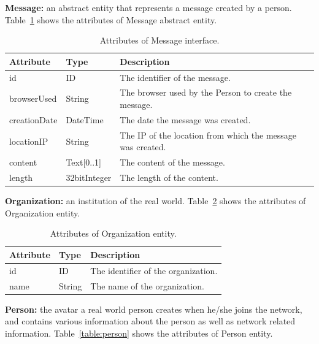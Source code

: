 {\flushleft \textbf{Message:}} an abstract entity that represents a message
created by a person. Table~\ref{table:message} shows the attributes of Message
abstract entity.

\begin{table}[H]
    \begin{tabular}{|p{2.5cm}|p{2.5cm}|p{10.5cm}|}
        \hline
        \textbf{Attribute} & \textbf{Type} & \textbf{Description} \\
        \hline
        id & ID  & The identifier of the message.\\
        \hline
        browserUsed & String  & The browser used by the Person to create the message.\\
        \hline
        creationDate & DateTime  & The date the message was created.\\
        \hline
        locationIP & String  & The IP of the location from which the message was created.\\
        \hline
        content & Text[0..1]  & The content of the message.\\
        \hline
        length & 32bitInteger  & The length of the content.\\
        \hline
    \end{tabular}
    \caption{Attributes of Message interface.}
    \label{table:message}
\end{table}

{\flushleft \textbf{Organization:}} an institution of the real
world. Table~\ref{table:organization} shows the attributes of Organization
entity.

\begin{table}[H]
    \begin{tabular}{|p{2.5cm}|p{2.5cm}|p{10.5cm}|}
        \hline
        \textbf{Attribute} & \textbf{Type} & \textbf{Description} \\
        \hline
        id & ID  & The identifier of the organization.\\
        \hline
        name & String  & The name of the organization.\\
        \hline
    \end{tabular}
    \caption{Attributes of Organization entity.}
    \label{table:organization}
\end{table}

{\flushleft \textbf{Person:}} the avatar a real world person creates
when he/she joins the network, and contains various information about the
person as well as network related information. Table~\ref{table:person} shows
the attributes of Person entity.

